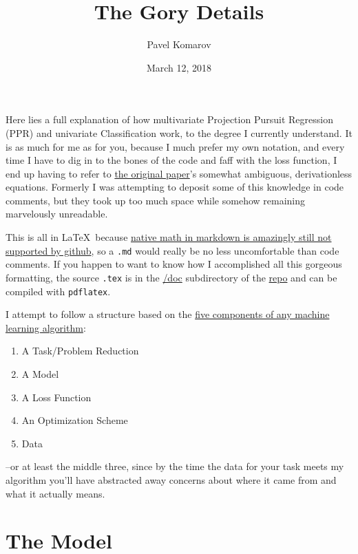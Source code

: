 \documentclass[12pt]{article}
\begin{document}
\title{The Gory Details}
\author{Pavel Komarov}
\date{March 12, 2018}
\maketitle

Here lies a full explanation of how multivariate Projection Pursuit Regression (PPR) and univariate Classification work, to the degree I currently understand. It is as much for me as for you, because I much prefer my own notation, and every time I have to dig in to the bones of the code and faff with the loss function, I end up having to refer to \href{http://www.slac.stanford.edu/cgi-wrap/getdoc/slac-pub-3824.pdf}{the original paper}'s somewhat ambiguous, derivationless equations. Formerly I was attempting to deposit some of this knowledge in code comments, but they took up too much space while somehow remaining marvelously unreadable.

This is all in \LaTeX\ because \href{https://github.com/github/markup/issues/897}{native math in markdown is amazingly still not supported by github}, so a \texttt{.md} would really be no less uncomfortable than code comments. If you happen to want to know how I accomplished all this gorgeous formatting, the source \texttt{.tex} is in the \href{https://github.com/pavelkomarov/projection-pursuit/tree/master/doc}{/doc} subdirectory of the \href{https://github.com/pavelkomarov/projection-pursuit}{repo} and can be compiled with \texttt{pdflatex}.

I attempt to follow a structure based on the \href{https://www.youtube.com/watch?v=H6ygbGX8OV8&t=9m19s}{five components of any machine learning algorithm}:

\begin{enumerate}
	\setlength\itemsep{-2mm}
	\item A Task/Problem Reduction
	\item A Model
	\item A Loss Function
	\item An Optimization Scheme
	\item Data
\end{enumerate}

--or at least the middle three, since by the time the data for your task meets my algorithm you'll have abstracted away concerns about where it came from and what it actually means.

\section{The Model}
\end{document}
